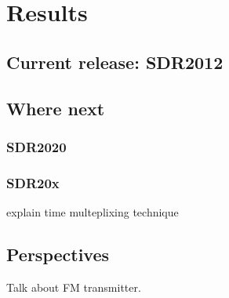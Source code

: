 \chapter{Results}
\section{Current release: SDR2012}
\section{Where next}
\subsection{SDR2020}
\subsection{SDR20x}
explain time multeplixing technique

\section{Perspectives}
Talk about FM transmitter.